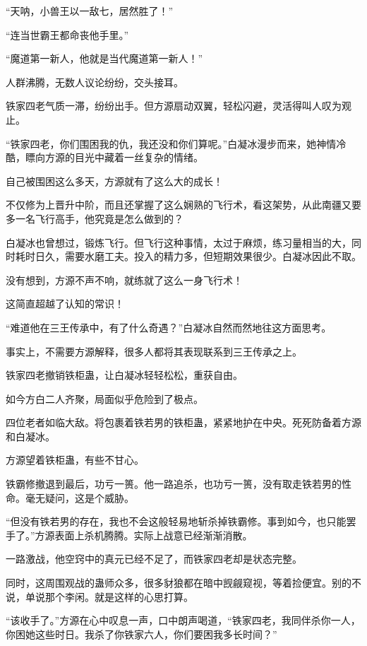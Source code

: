 
\begin{this_body}



“天呐，小兽王以一敌七，居然胜了！”

“连当世霸王都命丧他手里。”

“魔道第一新人，他就是当代魔道第一新人！”

人群沸腾，无数人议论纷纷，交头接耳。

铁家四老气质一滞，纷纷出手。但方源扇动双翼，轻松闪避，灵活得叫人叹为观止。

“铁家四老，你们围困我的仇，我还没和你们算呢。”白凝冰漫步而来，她神情冷酷，瞟向方源的目光中藏着一丝复杂的情绪。

自己被围困这么多天，方源就有了这么大的成长！

不仅修为上晋升中阶，而且还掌握了这么娴熟的飞行术，看这架势，从此南疆又要多一名飞行高手，他究竟是怎么做到的？

白凝冰也曾想过，锻炼飞行。但飞行这种事情，太过于麻烦，练习量相当的大，同时耗时日久，需要水磨工夫。投入的精力多，但短期效果很少。白凝冰因此不取。

没有想到，方源不声不响，就练就了这么一身飞行术！

这简直超越了认知的常识！

“难道他在三王传承中，有了什么奇遇？”白凝冰自然而然地往这方面思考。

事实上，不需要方源解释，很多人都将其表现联系到三王传承之上。

铁家四老撤销铁柜蛊，让白凝冰轻轻松松，重获自由。

如今方白二人齐聚，局面似乎危险到了极点。

四位老者如临大敌。将包裹着铁若男的铁柜蛊，紧紧地护在中央。死死防备着方源和白凝冰。

方源望着铁柜蛊，有些不甘心。

铁霸修撤退到最后，功亏一篑。他一路追杀，也功亏一篑，没有取走铁若男的性命。毫无疑问，这是个威胁。

“但没有铁若男的存在，我也不会这般轻易地斩杀掉铁霸修。事到如今，也只能罢手了。”方源表面上杀机腾腾。实际上战意已经渐渐消散。

一路激战，他空窍中的真元已经不足了，而铁家四老却是状态完整。

同时，这周围观战的蛊师众多，很多豺狼都在暗中觊觎窥视，等着捡便宜。别的不说，单说那个李闲。就是这样的心思打算。

“该收手了。”方源在心中叹息一声，口中朗声喝道，“铁家四老，我同伴杀你一人，你困她这些时日。我杀了你铁家六人，你们要困我多长时间？”


\end{this_body}
